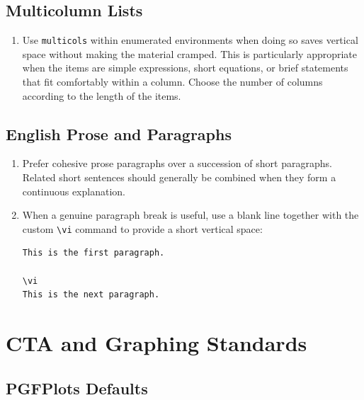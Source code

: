 \documentclass[document,notitlepage]{mhdocument}
\begin{document}
\subsection{Multicolumn Lists}

\begin{enumerate}[resume]
\item Use \texttt{multicols} within enumerated environments when doing so saves vertical space without making the material cramped. This is particularly appropriate when the items are simple expressions, short equations, or brief statements that fit comfortably within a column. Choose the number of columns according to the length of the items.
\end{enumerate}

\subsection{English Prose and Paragraphs}

\begin{enumerate}[resume]
\item Prefer cohesive prose paragraphs over a succession of short paragraphs. Related short sentences should generally be combined when they form a continuous explanation.

\item When a genuine paragraph break is useful, use a blank line together with the custom \verb|\vi| command to provide a short vertical space:
\begin{verbatim}
This is the first paragraph.

\vi
This is the next paragraph.
\end{verbatim}

\end{enumerate}

\section{CTA and Graphing Standards}

\subsection{PGFPlots Defaults}
\end{document}
